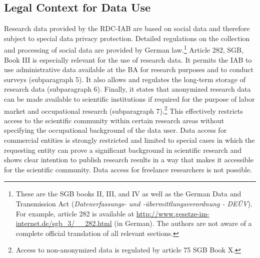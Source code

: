 \hypertarget{legal-context-for-data-use}{%
\subsection{Legal Context for Data Use}\label{legal-context-for-data-use}}

Research data provided by the RDC-IAB are based on social data and therefore subject to special data privacy protection. Detailed regulations on the collection and processing of social data are provided by German law.\footnote{These are the SGB books II, III, and IV as well as the German Data and Transmission Act (\emph{Datenerfassungs- und -übermittlungsverordnung - DEÜV}). For example, article 282 is available at \url{http://www.gesetze-im-internet.de/sgb_3/__282.html} (in German). The authors are not aware of a complete official translation of all relevant sections.} Article 282, SGB, Book III is especially relevant for the use of research data. It permits the IAB to use administrative data available at the BA for research purposes and to conduct surveys (subparagraph 5). It also allows and regulates the long-term storage of research data (subparagraph 6). Finally, it states that anonymized research data can be made available to scientific institutions if required for the purpose of labor market and occupational research (subparagraph 7).\footnote{Access to non-anonymized data is regulated by article 75 SGB Book X.} This effectively restricts access to the scientific community within certain research areas without specifying the occupational background of the data user. Data access for commercial entities is strongly restricted and limited to special cases in which the requesting entity can prove a significant background in scientific research and shows clear intention to publish research results in a way that makes it accessible for the scientific community. Data access for freelance researchers is not possible.

